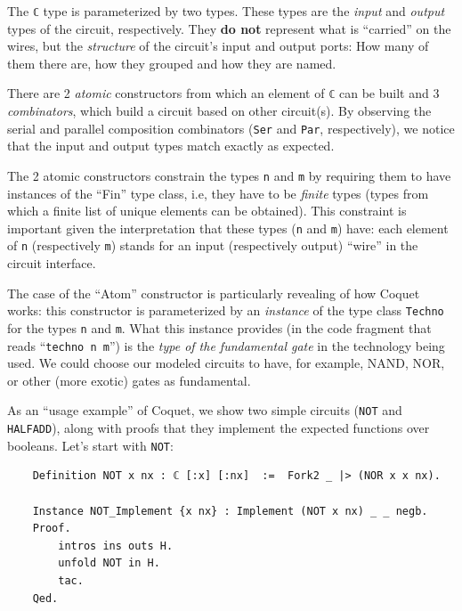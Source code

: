 \documentclass[a4paper]{article}
\begin{document}
                The \texttt{ℂ} type is parameterized by two types. These types are the \emph{input} and
                \emph{output} types of the circuit, respectively. They \textbf{do not} represent
                what is ``carried'' on the wires, but the \emph{structure} of the circuit's input
                and output ports: How many of them there are, how they grouped and how they are
                named.

                There are 2 \emph{atomic} constructors from which an element of \texttt{ℂ} can be
                built and 3 \emph{combinators}, which build a circuit based on other circuit(s). By
                observing the serial and parallel composition combinators (\texttt{Ser} and
                \texttt{Par}, respectively), we notice that the input and output types match exactly
                as expected.

                The 2 atomic constructors constrain the types \texttt{n} and \texttt{m} by requiring
                them to have instances of the ``Fin'' type class, i.e, they have to be \emph{finite}
                types (types from which a finite list of unique elements can be obtained). This
                constraint is important given the interpretation that these types (\texttt{n} and
                \texttt{m}) have: each element of \texttt{n} (respectively \texttt{m}) stands for an
                input (respectively output) ``wire'' in the circuit interface.

                The case of the ``Atom'' constructor is particularly revealing of how Coquet works:
                this constructor is parameterized by an \emph{instance} of the type class
                \texttt{Techno} for the types \texttt{n} and \texttt{m}. What this instance provides
                (in the code fragment that reads ``\texttt{techno n m}'') is the \emph{type of the
                    fundamental gate} in the technology being used. We could choose our modeled
                circuits to have, for example, NAND, NOR, or other (more exotic) gates as
                fundamental.

                As an ``usage example'' of Coquet, we show two simple circuits (\texttt{NOT} and
                \texttt{HALFADD}), along with proofs that they implement the expected functions over
                booleans. Let's start with \texttt{NOT}:
                \begin{verbatim}
    Definition NOT x nx : ℂ [:x] [:nx]  :=  Fork2 _ |> (NOR x x nx).

    Instance NOT_Implement {x nx} : Implement (NOT x nx) _ _ negb.
    Proof.
        intros ins outs H.
        unfold NOT in H.
        tac.
    Qed.
                \end{verbatim}
\end{document}
